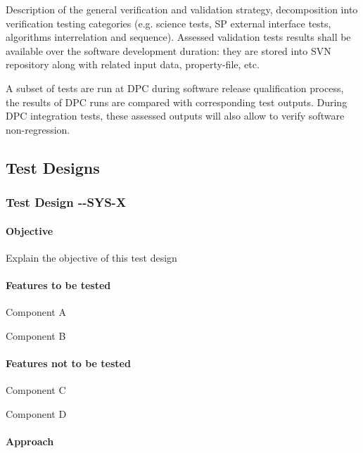 Description of the general verification and validation strategy, decomposition into verification testing categories (e.g. science tests, SP external interface tests, algorithms interrelation and sequence). Assessed validation tests results shall be available over the software development duration: they are stored into SVN repository along with related input data, property-file, etc.

A subset of tests are run at DPC during software release qualification process, the results of DPC runs are compared with corresponding test outputs. During DPC integration tests, these assessed outputs will also allow to verify software non-regression.
 
\subsection{Test Designs}

\subsubsection{Test Design \CU-\product-SYS-X}

\paragraph{Objective}

Explain the objective of this test design

\paragraph{Features to be tested}

\begin{itemize_single}
\item Component A
\item Component B
\end{itemize_single}

\paragraph{Features not to be tested}

\begin{itemize_single}
\item Component C
\item Component D
\end{itemize_single}

\paragraph{Approach}

